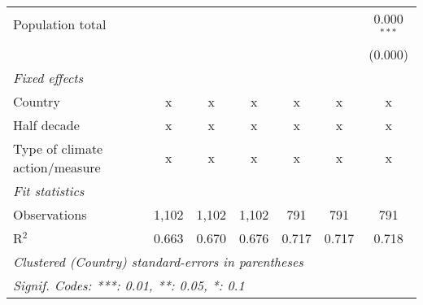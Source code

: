 \begin{tabular}{lcccccc}
   Population total                                                     &         &                &                &                &                & 0.000$^{***}$\\   
                                                                        &         &                &                &                &                & (0.000)\\   
   \emph{Fixed effects}\\
   Country                                                              & x       & x              & x              & x              & x              & x\\  
   Half decade                                                          & x       & x              & x              & x              & x              & x\\  
   Type of climate action/measure                                       & x       & x              & x              & x              & x              & x\\  
   \midrule \emph{Fit statistics}\\
   Observations                                                         & 1,102   & 1,102          & 1,102          & 791            & 791            & 791\\  
   R$^2$                                                                & 0.663   & 0.670          & 0.676          & 0.717          & 0.717          & 0.718\\  
   \midrule
   \multicolumn{7}{l}{\emph{Clustered (Country) standard-errors in parentheses}}\\
   \multicolumn{7}{l}{\emph{Signif. Codes: ***: 0.01, **: 0.05, *: 0.1}}\\
\end{tabular}
\par\endgroup


